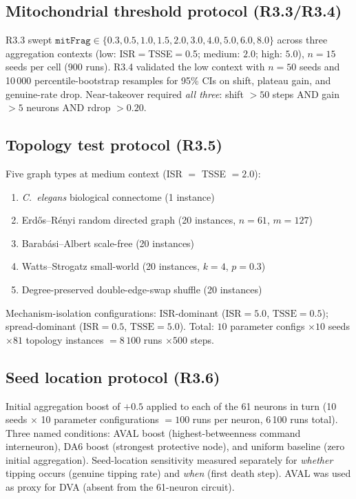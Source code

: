 \documentclass[12pt,a4paper]{article}
\begin{document}
\subsection{Mitochondrial threshold protocol (R3.3/R3.4)}

R3.3 swept $\texttt{mitFrag} \in \{0.3, 0.5, 1.0, 1.5, 2.0, 3.0, 4.0, 5.0, 6.0, 8.0\}$
across three aggregation contexts (low: ISR$=$TSSE$=$0.5; medium: $2.0$; high: $5.0$),
$n = 15$ seeds per cell (900 runs). R3.4 validated the low context with $n = 50$ seeds and
10\,000 percentile-bootstrap resamples for 95\% CIs on shift, plateau gain, and genuine-rate
drop. Near-takeover required \emph{all three}: shift $> 50$ steps AND gain $> 5$ neurons AND
rdrop $> 0.20$.

\subsection{Topology test protocol (R3.5)}

Five graph types at medium context (ISR $=$ TSSE $= 2.0$):

\begin{enumerate}
\item \textit{C.~elegans} biological connectome (1 instance)
\item Erd\H{o}s--R\'{e}nyi random directed graph (20 instances, $n=61$, $m=127$)
\item Barab\'{a}si--Albert scale-free (20 instances)
\item Watts--Strogatz small-world (20 instances, $k=4$, $p=0.3$)
\item Degree-preserved double-edge-swap shuffle (20 instances)
\end{enumerate}

Mechanism-isolation configurations: ISR-dominant ($\mathrm{ISR}=5.0$, $\mathrm{TSSE}=0.5$);
spread-dominant ($\mathrm{ISR}=0.5$, $\mathrm{TSSE}=5.0$). Total: $10$ parameter configs
$\times 10$ seeds $\times 81$ topology instances $= 8\,100$ runs $\times 500$ steps.

\subsection{Seed location protocol (R3.6)}

Initial aggregation boost of $+0.5$ applied to each of the 61 neurons in turn (10 seeds
$\times$ 10 parameter configurations $= 100$ runs per neuron, 6\,100 runs total). Three named
conditions: AVAL boost (highest-betweenness command interneuron), DA6 boost (strongest
protective node), and uniform baseline (zero initial aggregation). Seed-location sensitivity
measured separately for \emph{whether} tipping occurs (genuine tipping rate) and \emph{when}
(first death step). AVAL was used as proxy for DVA (absent from the 61-neuron circuit).
\end{document}
